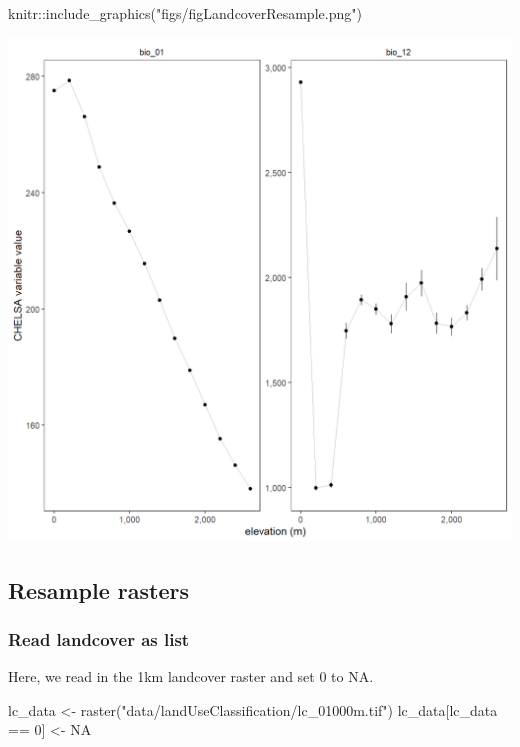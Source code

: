 \documentclass[]{article}
\newenvironment{Shaded}{}{}
\newcommand{\DecValTok}[1]{#1}
\newcommand{\KeywordTok}[1]{\textcolor[rgb]{0.00,0.00,1.00}{#1}}
\newcommand{\NormalTok}[1]{#1}
\newcommand{\OperatorTok}[1]{#1}
\newcommand{\OtherTok}[1]{\textcolor[rgb]{1.00,0.25,0.00}{#1}}
\newcommand{\StringTok}[1]{\textcolor[rgb]{0.00,0.50,0.50}{#1}}
\begin{document}
\begin{Shaded}
\begin{Highlighting}[]
\NormalTok{knitr}\OperatorTok{::}\KeywordTok{include_graphics}\NormalTok{(}\StringTok{"figs/figLandcoverResample.png"}\NormalTok{)}
\end{Highlighting}
\end{Shaded}

\begin{center}\includegraphics[width=\textwidth]{figs/figLandcoverResample} \end{center}

\hypertarget{resample-rasters}{%
\subsection{Resample rasters}\label{resample-rasters}}

\hypertarget{read-landcover-as-list}{%
\subsubsection{Read landcover as list}\label{read-landcover-as-list}}

Here, we read in the 1km landcover raster and set 0 to NA.

\begin{Shaded}
\begin{Highlighting}[]
\NormalTok{lc_data <-}\StringTok{ }\KeywordTok{raster}\NormalTok{(}\StringTok{"data/landUseClassification/lc_01000m.tif"}\NormalTok{)}
\NormalTok{lc_data[lc_data }\OperatorTok{==}\StringTok{ }\DecValTok{0}\NormalTok{] <-}\StringTok{ }\OtherTok{NA}
\end{Highlighting}
\end{Shaded}
\end{document}
